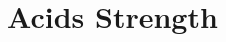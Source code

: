 \documentclass{book}
\begin{document}
 
 
  \newcommand\chapterlabel{}\newcommand\ChapterNameLabel{}\newcommand\labname{}\newcommand\chapterpathtocontent{}\newcommand\chapterpathtoimages{}\newcommand\chapterpath{} 

\section{Acids Strength}
\renewcommand\chapterlabel{Ch-acidbase}\renewcommand\ChapterNameLabel{\chapterlabel}\renewcommand\labname{relativestrenthofacids}\renewcommand\chapterpathtocontent{../../}\renewcommand\chapterpathtoimages{\chapterpathtocontent}\renewcommand\chapterpath{../../\chapterlabel/LAB-\labname/}
\end{document}
